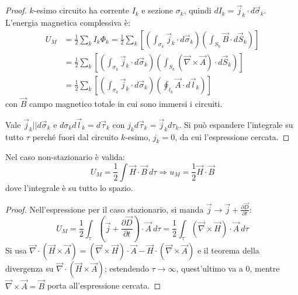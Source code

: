 \documentclass[a4paper]{scrartcl}
\numberwithin{equation}{subsection}
\theoremstyle{style1}
\newenvironment{boxenv}[1][]{
    \begin{eqbox}[#1]
    }{
   \end{eqbox}
}
\begin{document}
\begin{boxenv}[]
\begin{proof}
	$k$-esimo circuito ha corrente $I_k$ e sezione $\sigma _k$, quindi $dI_k = \vec{j}_k\cdot d\vec{\sigma }_k$. L'energia magnetica complessiva \`e:
	\[
		\begin{split}
			U_M &= \frac{1}{2}\sum_{k}^{} I_k\Phi_k = \frac{1}{2}\sum_{k}^{} \left[ \left(\int_{\sigma _k} \vec{j}_k\cdot d\vec{\sigma }_k\right)  \left(\int_{S_k} \vec{B}\cdot d\vec{S}_k\right)  \right] \\
			    &= \frac{1}{2}\sum_{k}^{} \left[ \left(\int_{\sigma _k} \vec{j}_k\cdot d\vec{\sigma }_k\right)  \left(\int_{S_k} (\vec{\nabla }\times \vec{A})\cdot d\vec{S}_k\right)  \right] \\
			    &= \frac{1}{2}\sum_{k}^{} \left[ \left(\int_{\sigma _k} \vec{j}_k\cdot d\vec{\sigma }_k\right)  \left(\oint_{l_k} \vec{A} \cdot d\vec{l}_k\right)  \right] 
		\end{split}
	\] 
	con $\vec{B}$ campo magnetico totale in cui sono immersi i circuiti. 

	Vale $\vec{j}_k | | d\vec{\sigma }_k$ e $d\sigma_k d\vec{l}_k = d\vec{\tau }_k$ con $j_kd\vec{\tau }_k = \vec{j}_k d\tau _k$. Si pu\`o espandere l'integrale su tutto $\tau $ perch\'e fuori dal circuito $k$-esimo, $j_k=0$, da cui l'espressione cercata.
\end{proof}
\end{boxenv}
\noindent Nel caso non-stazionario \`e valida:
\begin{equation}
	U_M = \frac{1}{2}\int \vec{H}\cdot \vec{B}\ d\tau \Rightarrow u_M = \frac{1}{2} \vec{H}\cdot \vec{B}
\end{equation}
dove l'integrale \`e su tutto lo spazio.
\begin{boxenv}[]
\begin{proof}
	Nell'espressione per il caso stazionario, si manda $\vec{j}\to \vec{j} + \frac{\partial \vec{D}}{\partial t} $:
	\[
	U_M = \frac{1}{2}\int_{\tau } \left(\vec{j}+\frac{\partial \vec{D}}{\partial t} \right) \cdot \vec{A}\ d\tau = \frac{1}{2}\int_{\tau } (\vec{\nabla }\times \vec{H}) \cdot \vec{A}\ d\tau 
	\] 
	Si usa $\vec{\nabla }\cdot (\vec{H}\times \vec{A}) = (\vec{\nabla }\times \vec{H}) \cdot \vec{A} - \vec{H}\cdot (\vec{\nabla }\times \vec{A})$ e il teorema della divergenza su $\vec{\nabla }\cdot (\vec{H}\times \vec{A})$; estendendo $\tau \to \infty$, quest'ultimo va a $0$, mentre $\vec{\nabla }\times \vec{A}=\vec{B}$ porta all'espressione cercata.
\end{proof}
\end{boxenv}
\end{document}
